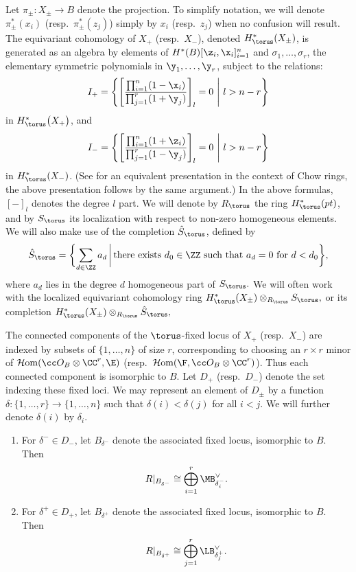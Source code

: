 Let
$\pi_{\pm}\colon X_\pm \to B$ denote the projection. To simplify notation, we will denote $\pi_\pm^*(x_i)$ (resp.\ $\pi_\pm^*(z_j)$) simply by $x_i$ (resp.\ $z_j$) when no confusion will result.
The equivariant cohomology of $X_+$ (resp.\ $X_-$), denoted $H^*_\torus(X_{\pm})$, is generated as an algebra by elements of
$H^*(B)[\z_i, \x_i]_{i=1}^n$
and $\sigma_1, \dots, \sigma_r$, the elementary symmetric polynomials in $\y_1, \dots , \y_r$, subject to the relations:
\begin{equation*}%
I_+ = \left\{ \left[ \frac{\prod_{i=1}^n(1 - \x_i)}{\prod_{j=1}^r (1 + \y_j)}\right]_{l} = 0\ \middle| \ l> n-r \right\}
\end{equation*}
in $H^*_\torus\bigl(X_+\bigr)$, and
\begin{equation*}%
I_- = \left\{ \left[ \frac{\prod_{i=1}^n(1 + \z_i)}{\prod_{j=1}^r (1 - \y_j)}\right]_{l} = 0 \ \middle| \ l> n-r \right\}
\end{equation*}
in $H^*_\torus(X_-)$. (See \cite[Example 14.6.6]{Fulton} for an equivalent presentation in the context of Chow rings, the above presentation follows by the same argument.) In the above formulas, $\left[ - \right]_{l}$ denotes the degree $l$ part. We will denote by $R_\torus$ the ring $H^*_\torus(pt)$, and by $S_\torus$ its localization with respect to non-zero homogeneous elements. We will also make use of the completion
$\hat S_\torus$, defined by
\[
\hat S_\torus = \biggl\{ \sum_{d \in \ZZ} a_d \, \bigg| \, \text{there exists $d_0 \in \ZZ$ such that $a_d = 0$ for $d < d_0$}\biggr\},
\]
where $a_d$ lies in the degree $d$ homogeneous part of $S_\torus.$
We will often work with the localized equivariant cohomology ring $H^*_\torus(X_\pm) \otimes_{R_\torus} S_\torus,$ or its completion $H^*_\torus(X_\pm) \otimes_{R_\torus} \hat S_\torus,$


The connected components of the $\torus$-fixed locus of $X_+$ (resp.\ $X_-$) are indexed by subsets of $\{1, \dots, n\}$ of size $r$, corresponding to choosing an $r \times r$ minor of $\mathcal{H}{\rm om}(\cc O_B \otimes \CC^r, \E)$ (resp.\ $\mathcal{H}{\rm om}(\F, \cc O_B \otimes \CC^r)$). Thus each connected component is isomorphic to $B$. Let $D_{+}$ (resp.\ $D_{-}$) denote the set indexing these fixed loci.
We may represent an element of $D_\pm$ by a function $\delta\colon \{1, \dots, r\} \to \{1, \dots, n\}$ such that
$\delta(i)<\delta(j)$ for all $i<j$.
 We will further denote $\delta(i)$ by $\delta_i$.



\begin{Lemma}\label{l:rest}\quad
\begin{enumerate}\itemsep=0pt\itemsep=0pt
\item[$1.$] For $\delta^- \in D_{-}$, let $B_{\delta^-} $ denote the associated fixed locus, isomorphic to $B$. Then
\[ R|_{B_{\delta^-}} \cong \bigoplus_{i=1}^r \MB_{\delta^-_i}^\vee.\]
\item[$2.$] For $\delta^+ \in D_{+}$, let $B_{\delta^+} $ denote the associated fixed locus, isomorphic to $B$. Then
\[R|_{B_{\delta^+}} \cong \bigoplus_{j=1}^r \LB_{\delta^+_j}^\vee.\]
\end{enumerate}
\end{Lemma}

